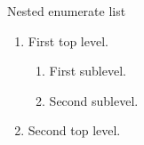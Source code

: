 \documentclass[14pt,t]{beamer-accessibility}
\begin{document}
\begin{frame}{Nested enumerate list}
\begin{enumerate}
\item First top level.
  \begin{enumerate}
  \item First sublevel.
  \item Second sublevel.
  \end{enumerate}
\item Second top level.
\end{enumerate}
\end{frame}
\end{document}
